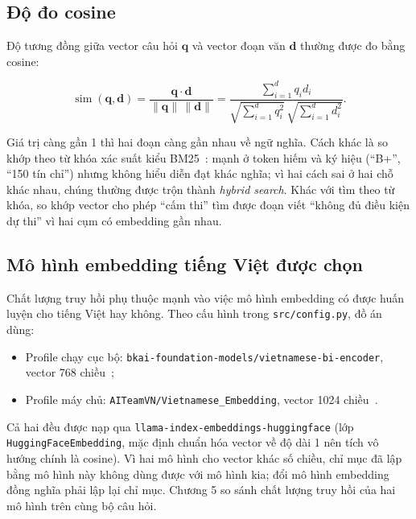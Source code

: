 \subsection{Độ đo cosine}

Độ tương đồng giữa vector câu hỏi $\mathbf{q}$ và vector đoạn văn $\mathbf{d}$ thường được đo bằng cosine:

\begin{equation}
  \operatorname{sim}(\mathbf{q}, \mathbf{d})
  = \frac{\mathbf{q}\cdot\mathbf{d}}{\lVert\mathbf{q}\rVert\,\lVert\mathbf{d}\rVert}
  = \frac{\sum_{i=1}^{d} q_i d_i}{\sqrt{\sum_{i=1}^{d} q_i^2}\,\sqrt{\sum_{i=1}^{d} d_i^2}} .
\end{equation}

Giá trị càng gần 1 thì hai đoạn càng gần nhau về ngữ nghĩa. Cách khác là so khớp theo từ khóa xác suất kiểu BM25~\cite{robertson2009bm25}: mạnh ở token hiếm và ký hiệu (``B+'', ``150 tín chỉ'') nhưng không hiểu diễn đạt khác nghĩa; vì hai cách sai ở hai chỗ khác nhau, chúng thường được trộn thành \emph{hybrid search}. Khác với tìm theo từ khóa, so khớp vector cho phép ``cấm thi'' tìm được đoạn viết ``không đủ điều kiện dự thi'' vì hai cụm có embedding gần nhau.

\subsection{Mô hình embedding tiếng Việt được chọn}

Chất lượng truy hồi phụ thuộc mạnh vào việc mô hình embedding có được huấn luyện cho tiếng Việt hay không. Theo cấu hình trong \texttt{src/config.py}, đồ án dùng:

\begin{itemize}
  \item Profile chạy cục bộ: \texttt{bkai-foundation-models/vietnamese-bi-encoder}, vector 768 chiều~\cite{vietnamesebiencoder};
  \item Profile máy chủ: \texttt{AITeamVN/Vietnamese\_Embedding}, vector 1024 chiều~\cite{vietnameseembedding}.
\end{itemize}

Cả hai đều được nạp qua \texttt{llama-index-embeddings-huggingface} (lớp \texttt{HuggingFaceEmbedding}, mặc định chuẩn hóa vector về độ dài 1 nên tích vô hướng chính là cosine). Vì hai mô hình cho vector khác số chiều, chỉ mục đã lập bằng mô hình này không dùng được với mô hình kia; đổi mô hình embedding đồng nghĩa phải lập lại chỉ mục. Chương 5 so sánh chất lượng truy hồi của hai mô hình trên cùng bộ câu hỏi.

